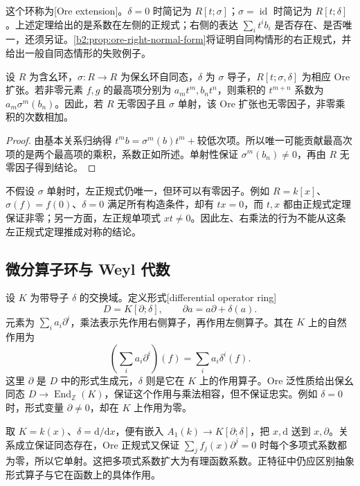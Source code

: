 这个环称为[Ore extension]。\(\delta=0\) 时简记为 \(R[t;\sigma]\)；\(\sigma=\operatorname{id}\) 时简记为 \(R[t;\delta]\)。上述定理给出的是系数在左侧的正规式；右侧的表达 \(\sum_i t^ib_i\) 是否存在、是否唯一，还须另证。\cref{b2:prop:ore-right-normal-form}将证明自同构情形的右正规式，并给出一般自同态情形的失败例子。

\begin{proposition}\label{b2:prop:ore-leading-degree}
	设 \(R\) 为含幺环，\(\sigma:R\rightarrow R\) 为保幺环自同态，\(\delta\) 为 \(\sigma\) 导子，\(R[t;\sigma,\delta]\) 为相应 Ore 扩张。若非零元素 \(f,g\) 的最高项分别为 \(a_mt^m,b_nt^n\)，则乘积的 \(t^{m+n}\) 系数为 \(a_m\sigma^m(b_n)\)。因此，若 \(R\) 无零因子且 \(\sigma\) 单射，该 Ore 扩张也无零因子，非零乘积的次数相加。
\end{proposition}
\begin{proof}
	由基本关系归纳得 \(t^m b=\sigma^m(b)t^m+\text{较低次项}\)。所以唯一可能贡献最高次项的是两个最高项的乘积，系数正如所述。单射性保证 \(\sigma^m(b_n)\ne0\)，再由 \(R\) 无零因子得到结论。
\end{proof}

不假设 \(\sigma\) 单射时，左正规式仍唯一，但环可以有零因子。例如 \(R=k[x]\)、\(\sigma(f)=f(0)\)、\(\delta=0\) 满足所有构造条件，却有 \(tx=0\)，而 \(t,x\) 都由正规式定理保证非零；另一方面，左正规单项式 \(xt\ne0\)。因此左、右乘法的行为不能从这条左正规式定理推成对称的结论。

\subsection{微分算子环与 Weyl 代数}
\label{b2:subsec:2005:03}

设 \(K\) 为带导子 \(\delta\) 的交换域。定义形式[differential operator ring]
\[
	D=K[\partial;\delta],\qquad \partial a=a\partial+\delta(a).
\]
元素为 \(\sum_i a_i\partial^i\)，乘法表示先作用右侧算子，再作用左侧算子。其在 \(K\) 上的自然作用为
\[
	\left(\sum_i a_i\partial^i\right)(f)=\sum_i a_i\delta^i(f).
\]
这里 \(\partial\) 是 \(D\) 中的形式生成元，\(\delta\) 则是它在 \(K\) 上的作用算子。Ore 泛性质给出保幺同态 \(D\to\operatorname{End}_{\mathbb Z}(K)\)，保证这个作用与乘法相容，但不保证忠实。例如 \(\delta=0\) 时，形式变量 \(\partial\ne0\)，却在 \(K\) 上作用为零。

\ProseParagraphBreak
取 \(K=k(x)\)、\(\delta=\mathrm{d}/\mathrm{d}x\)，便有嵌入 \(A_1(k)\to K[\partial;\delta]\)，把 \(x,\mathrm{d}\) 送到 \(x,\partial\)。关系成立保证同态存在，Ore 正规式又保证 \(\sum_j f_j(x)\partial^j=0\) 时每个多项式系数都为零，所以它单射。这把多项式系数扩大为有理函数系数。正特征中仍应区别抽象形式算子与它在函数上的具体作用。

